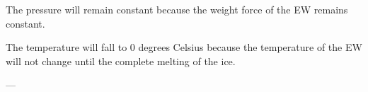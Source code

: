 The pressure will remain constant because the weight force of the EW remains constant.  

The temperature will fall to 0 degrees Celsius because the temperature of the EW will not change until the complete melting of the ice.  

---